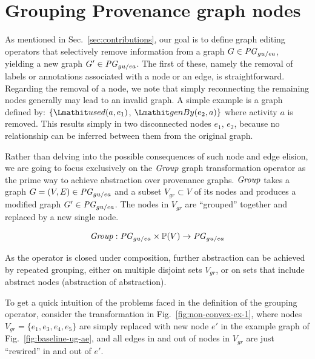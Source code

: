 \section{Grouping Provenance graph nodes}  \label{sec:grouping}




As mentioned in Sec.~\ref{sec:contributions}, our goal is to define graph editing operators that selectively remove information from a graph $G \in \mathit{PG}_{gu/ea}$, yielding a new graph $G' \in \mathit{PG}_{gu/ea}$.
%
The first of these, namely the removal of labels or annotations associated with a node or an edge, is straightforward. 
%
Regarding the removal of a node, we note that simply reconnecting the remaining nodes generally may lead to an invalid graph. 
%
A simple example is a graph defined by: $\{\used(a, e_1)$, $\wgby(e_2, a) \}$ where activity $a$ is removed. This results simply in two disconnected nodes $e_1$, $e_2$, because no relationship can be inferred between them from the original graph.


Rather than delving into the possible consequences of such node and edge elision, we are going to focus exclusively on the $\mathit{Group}$ graph transformation operator as the prime way to achieve abstraction over provenance graphs.
%
$\mathit{Group}$ takes a graph $G = (V, E) \in \mathit{PG}_{gu/ea}$ and a subset $V_{gr} \subset V$ of its nodes  and produces a modified graph $G' \in \mathit{PG}_{gu/ea}$. The nodes in $V_{gr}$ are ``grouped'' together and replaced by a new single node.
%
  
\[ \mathit{Group} : \mathit{PG}_{gu/ea} \times \mathbb{P}(V) \rightarrow \mathit{PG}_{gu/ea} \]
  


%
As the operator is closed under composition, further abstraction can be achieved by repeated grouping, either on multiple disjoint sets $V_{gr}$, or on sets that include abstract nodes (abstraction of abstraction).



%
To get a quick intuition of the  problems faced in the definition of the grouping operator, consider the transformation in Fig.~\ref{fig:non-convex-ex-1}, where nodes $V_{gr} = \{e_1, e_3, e_4, e_5\}$ are simply replaced with new node $e'$ in the example graph of Fig.~\ref{fig:baseline-ug-ae}, and all edges in and out of nodes in $V_{gr}$ are just ``rewired'' in and out of $e'$. 

